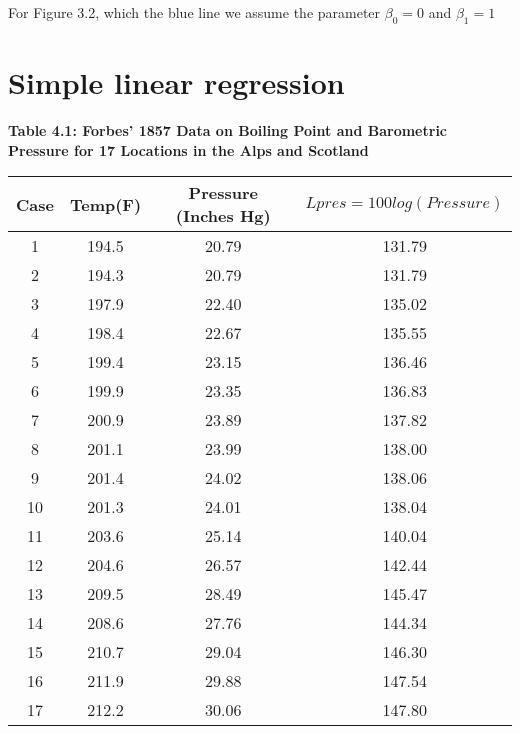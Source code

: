\documentclass{article}
\begin{document}
\begin{center}
    \end{center}
    
    For Figure 3.2, which the blue line we assume the parameter ${\beta _{0} = 0}$ and ${\beta _{1} = 1}$
    
\section{Simple linear regression} 

    \begin{center}
        \textbf{Table 4.1: Forbes’ 1857 Data on Boiling Point and Barometric Pressure for 17 Locations in the Alps and Scotland}
        
        \begin{tabular}{|cccc|}
            \hline 
            Case & Temp(F) & Pressure (Inches Hg) & ${Lpres=100log(Pressure)}$ \\
            \hline
            1 & 194.5 & 20.79 & 131.79 \\
            2 & 194.3 & 20.79 & 131.79 \\
            3 & 197.9 & 22.40 & 135.02 \\
            4 & 198.4 & 22.67 & 135.55 \\
            5 & 199.4 & 23.15 & 136.46 \\ 
            6 & 199.9 & 23.35 & 136.83 \\
            7 & 200.9 & 23.89 & 137.82 \\
            8 & 201.1 & 23.99 & 138.00 \\ 
            9 & 201.4 & 24.02 & 138.06 \\
            10 & 201.3 & 24.01 & 138.04 \\
            11 & 203.6 & 25.14 & 140.04 \\
            12 & 204.6 & 26.57 & 142.44 \\
            13 & 209.5 & 28.49 & 145.47 \\
            14 & 208.6 & 27.76 & 144.34 \\
            15 & 210.7 & 29.04 & 146.30 \\
            16 & 211.9 & 29.88 & 147.54 \\
            17 & 212.2 & 30.06 & 147.80 \\
            \hline
        \end{tabular}
    \end{center}
    
\end{document}
